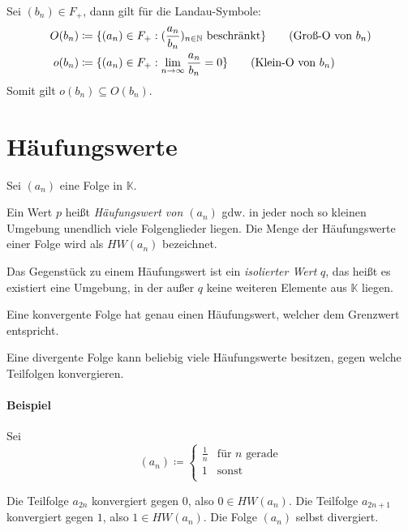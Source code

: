 		Sei $ (b _ n) \in F _ + $, dann gilt für die Landau-Symbole:
		\begin{align*}
			O(b _ n) & \coloneqq \{ (a _ n) \in F _ + : (\frac{a _ n}{b _ n}) _ { n \in \mathbb{N} } \text{ beschränkt} \} \tag{Groß-O von $ b _ n $} \\
			o(b _ n) & \coloneqq \{ (a _ n) \in F _ + : \lim_{n \to \infty} \frac{a _ n}{b _ n} = 0 \} \tag{Klein-O von $ b _ n $}                              \\
		\end{align*}
		Somit gilt $ o(b _ n) \subseteq O(b _ n) $.

	\section{Häufungswerte}
		Sei $ (a _ n) $ eine Folge in $ \mathbb{K} $.

		Ein Wert $ p $ heißt \textit{Häufungswert von $ (a _ n) $} gdw. in jeder noch so kleinen Umgebung unendlich viele Folgenglieder liegen. Die Menge der Häufungswerte einer Folge wird als $ HW(a _ n) $ bezeichnet.

		Das Gegenstück zu einem Häufungswert ist ein \textit{isolierter Wert} $ q $, das heißt es existiert eine Umgebung, in der außer $ q $ keine weiteren Elemente aus $ \mathbb{K} $ liegen.

		Eine konvergente Folge hat genau einen Häufungswert, welcher dem Grenzwert entspricht.

		Eine divergente Folge kann beliebig viele Häufungswerte besitzen, gegen welche Teilfolgen konvergieren.

		\paragraph{Beispiel}
			Sei
			\begin{equation*}
				(a _ n) \coloneqq
				\begin{cases}
					\frac{1}{n} & \text{für } n \text{ gerade} \\
					1           & \text{sonst}                 \\
				\end{cases}
			\end{equation*}

			Die Teilfolge $ a _ { 2n } $ konvergiert gegen $ 0 $, also $ 0 \in HW(a _ n) $. Die Teilfolge $ a _ { 2n + 1 } $ konvergiert gegen $ 1 $, also $ 1 \in HW(a _ n) $. Die Folge $ (a _ n) $ selbst divergiert.

